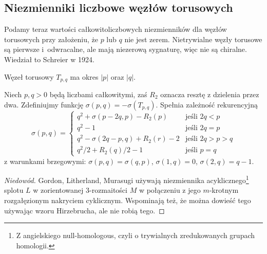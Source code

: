 
\subsection{Niezmienniki liczbowe węzłów torusowych}
Podamy teraz wartości całkowitoliczbowych niezmienników dla węzłów torusowych przy założeniu, że $p$ lub $q$ nie jest zerem.
Nietrywialne węzły torusowe są pierwsze i~odwracalne, ale mają niezerową sygnaturę, więc nie są chiralne.
Wiedział to Schreier w 1924.

\begin{proposition}
%
    Węzeł torusowy $T_{p, q}$ ma okres $|p|$ oraz $|q|$.
\end{proposition}

\begin{proposition}
%
    Niech $p, q > 0$ będą liczbami całkowitymi, zaś $R_2$ oznacza resztę z dzielenia przez dwa.
    Zdefiniujmy funkcję $\sigma(p, q) = - \sigma(T_{p, q})$.
    Spełnia zależność rekurencyjną
    \begin{equation}
        \sigma(p, q) = \begin{cases}
             q^2 + \sigma(p-2q, p) - R_2(p)       & \text{jeśli } 2q < p \\
             q^2 - 1                              & \text{jeśli } 2q = p \\
             q^2 - \sigma(2q - p, q) + R_2(r) - 2 & \text{jeśli } 2q > p > q \\
             q^2/2 + R_2(q)/2 - 1                 & \text{jeśli } p = q
        \end{cases}
    \end{equation}
    z warunkami brzegowymi: $\sigma(p, q) = \sigma(q, p)$, $\sigma(1, q) = 0$, $\sigma(2, q) = q-1$.
\end{proposition}

\begin{proof}[Niedowód]
%
%
%
    Gordon, Litherland, Murasugi \cite[tw. 5.2]{litherland81} używają niezmiennika acyklicznego\footnote{Z angielskiego null-homologous, czyli o trywialnych zredukowanych grupach homologii.} splotu $L$ w zorientowanej 3-rozmaitości $M$ w połączeniu z jego $m$-krotnym rozgałęzionym nakryciem cyklicznym.
    Wspominają też, że można dowieść tego używając wzoru Hirzebrucha, ale nie robią tego.
\end{proof}

